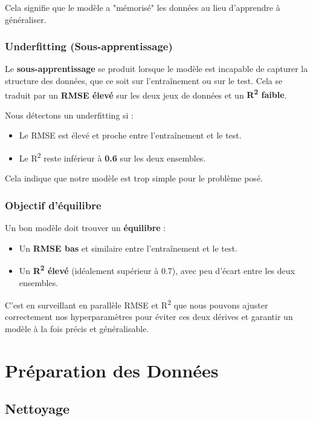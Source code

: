 \documentclass[12pt]{report}
\begin{document}
Cela signifie que le modèle a "mémorisé" les données au lieu d'apprendre à généraliser.

\subsubsection{Underfitting (Sous-apprentissage)}

Le \textbf{sous-apprentissage} se produit lorsque le modèle est incapable de capturer la structure des données, que ce soit sur l'entraînement ou sur le test. Cela se traduit par un \textbf{RMSE élevé} sur les deux jeux de données et un \textbf{R\textsuperscript{2} faible}.

Nous détectons un underfitting si :
\begin{itemize}
    \item Le RMSE est élevé et proche entre l'entraînement et le test.
    \item Le R\textsuperscript{2} reste inférieur à \textbf{0.6} sur les deux ensembles.
\end{itemize}

Cela indique que notre modèle est trop simple pour le problème posé.

\subsubsection{Objectif d'équilibre}

Un bon modèle doit trouver un \textbf{équilibre} :
\begin{itemize}
    \item Un \textbf{RMSE bas} et similaire entre l'entraînement et le test.
    \item Un \textbf{R\textsuperscript{2} élevé} (idéalement supérieur à 0.7), avec peu d'écart entre les deux ensembles.
\end{itemize}

C'est en surveillant en parallèle RMSE et R\textsuperscript{2} que nous pouvons ajuster correctement nos hyperparamètres pour éviter ces deux dérives et garantir un modèle à la fois précis et généralisable.



\section{Préparation des Données}

\subsection{Nettoyage}
\end{document}
